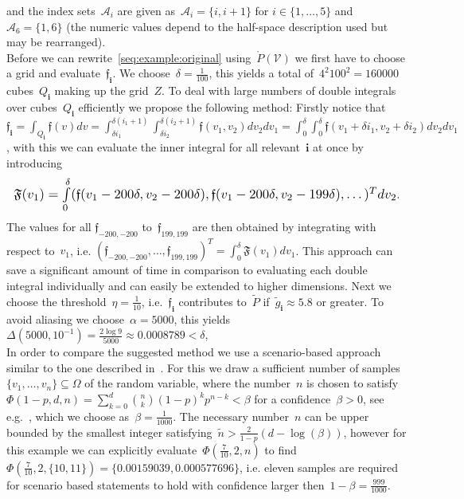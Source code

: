\documentclass[letterpaper, 10pt, conference]{ieeeconf} %
\newcommand*{\Resize}[1]{\resizebox{\columnwidth}{!}{$#1$}}
\providecommand{\bfa}[1]{\mathbf{#1}}
\begin{document}
%
and the index sets~$\mathcal A_i$ are given as~$\mathcal A_i=\{i,i+1\}$ for $i\in\{1,\dots,5\}$ and~$\mathcal A_6=\{1,6\}$ (the numeric values depend to the half-space description used but may be rearranged).
%
\\[1em]
%
Before we can rewrite~\eqref{seq:example:original} using~$\mathring P(\mathcal V)$ we first have to choose a grid and evaluate~$\mathfrak f_\bfa{i}$.
%
We choose~$\delta=\frac{1}{100}$, this yields a total of~$4^2 100^2=160000$ cubes~$Q_\bfa{i}$ making up the grid~$Z$.
%
To deal with large numbers of double integrals over cubes~$Q_\bfa{i}$ efficiently we propose the following method:
%
Firstly notice that~$\mathfrak f_\bfa{i}=\int_{Q_\bfa{i}}\mathfrak f(v)dv = \int_{\delta i_1}^{\delta(i_1+1)}\int_{\delta i_2}^{\delta(i_2+1)}\mathfrak f(v_1,v_2)dv_2dv_1 = \int_0^\delta\int_0^\delta \mathfrak f(v_1+\delta i_1,v_2+\delta i_2)dv_2dv_1$, with this we can evaluate the inner integral for all relevant~$\bfa{i}$ at once by introducing
%
\[
\Resize{\mathfrak F(v_1) = \int\limits_0^\delta (\mathfrak f(v_1-200\delta,v_2-200\delta), \mathfrak f(v_1-200\delta,v_2-199\delta),\dots)^T dv_2}.
\]
%
The values for all $\mathfrak f_{-200,-200}$ to~$\mathfrak f_{199,199}$ are then obtained by integrating with respect to~$v_1$, i.e. $(\mathfrak f_{-200,-200},\dots,\mathfrak f_{199,199})^T=\int_0^\delta\mathfrak F(v_1)dv_1$.
%
This approach can save a significant amount of time in comparison to evaluating each double integral individually and can easily be extended to higher dimensions.
%
Next we choose the threshold~$\eta=\frac{1}{10}$, i.e.~$\mathfrak f_\bfa{i}$ contributes to~$\tilde{P}$ if~$\tilde g_\bfa{i}\approx5.8$ or greater.
%
To avoid aliasing we choose~$\alpha=5000$, this yields~$\Delta(5000,10^{-1}) = \frac{2\log9}{5000}\approx0.0008789<\delta$,
%
\\[1em]
%
In order to compare the suggested method we use a scenario-based approach similar to the one described in~\cite{Margellos:2014}.
%
For this we draw a sufficient number of samples~$\{v_1,\dots,v_n\}\subseteq\Omega$ of the random variable, where the number~$n$ is chosen to satisfy~$\Phi(1-p,d,n) = \sum_{k=0}^{d}\binom{n}{k}(1-p)^kp^{n-k}<\beta$ for a confidence~$\beta>0$, see e.g.~\cite{Calafiore:2010}, which we choose as~$\beta=\frac{1}{1000}$.
%
The necessary number~$n$ can be upper bounded by the smallest integer satisfying~$\tilde n>\frac{2}{1-p}(d-\log(\beta))$, however for this example we can explicitly evaluate~$\Phi(\frac{7}{10},2,n)$ to find $\Phi(\frac{7}{10},2,\{10,11\}) = \{0.00159039,0.000577696\}$, i.e. eleven samples are required for scenario based statements to hold with confidence larger then~$1-\beta=\frac{999}{1000}$.
\end{document}
